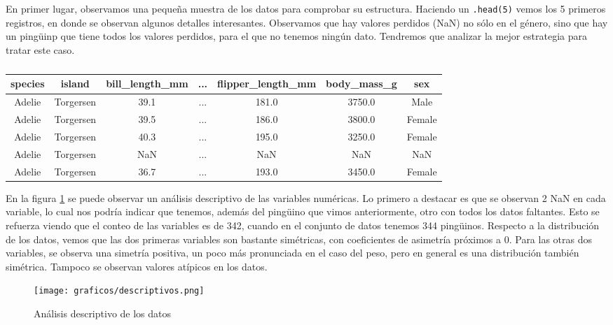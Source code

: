 \documentclass[a4paper,onecolumn]{extarticle}
\begin{document}
\begin{sloppypar}
En primer lugar, observamos una pequeña muestra de los datos para comprobar su estructura. Haciendo un \texttt{.head(5)} vemos los 5 primeros registros, en 
donde se observan algunos detalles interesantes. Observamos que hay valores perdidos (NaN) no sólo en el género, sino que hay un pingüinp que tiene todos 
los valores perdidos, para el que no tenemos ningún dato. Tendremos que analizar la mejor estrategia para tratar este caso.
\begin{table}[h!]
    \begin{tabular}{|c c c c c c c|}
        \hline
        \textbf{species} & \textbf{island} & \textbf{bill\_length\_mm} & \textbf{...} & \textbf{flipper\_length\_mm} & \textbf{body\_mass\_g} & \textbf{sex} \\
        \hline
        Adelie & Torgersen & 39.1 & ... & 181.0 & 3750.0 & Male \\
        Adelie & Torgersen & 39.5 & ... & 186.0 & 3800.0 & Female \\
        Adelie & Torgersen & 40.3 & ... & 195.0 & 3250.0 & Female \\
        Adelie & Torgersen & NaN & ... & NaN & NaN & NaN \\
        Adelie & Torgersen & 36.7 & ... & 193.0 & 3450.0 & Female \\
        \hline
    \end{tabular}
    \caption{}
    \label{tab:headDF}
\end{table}

En la figura \ref{fig:descriptivos} se puede observar un análisis descriptivo de las variables numéricas. Lo primero a destacar es que se observan 2 NaN en 
cada variable, lo cual nos podría indicar que tenemos, además del pingüino que vimos anteriormente, otro con todos los datos faltantes. Esto se refuerza 
viendo que el conteo de las variables es de 342, cuando en el conjunto de datos tenemos 344 pingüinos. Respecto a la distribución de los datos, vemos que las 
dos primeras variables son bastante simétricas, con coeficientes de asimetría próximos a 0. Para las otras dos variables, se observa una simetría positiva, 
un poco más pronunciada en el caso del peso, pero en general es una distribución también simétrica. Tampoco se observan valores atípicos en los datos.
\begin{center}
    \begin{figure}[h!]
        \centering
        \texttt{[image: graficos/descriptivos.png]}
        \caption{Análisis descriptivo de los datos}
        \label{fig:descriptivos}
    \end{figure}
\end{center}


\end{sloppypar}
\end{document}
